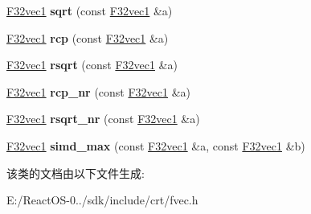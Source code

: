 \begin{DoxyCompactItemize}
\hyperlink{class_f32vec1}{F32vec1} {\bfseries sqrt} (const \hyperlink{class_f32vec1}{F32vec1} \&a)
\item 
\mbox{\label{class_f32vec1_a11d412a87554511165468d68f84c8e54}} 
\hyperlink{class_f32vec1}{F32vec1} {\bfseries rcp} (const \hyperlink{class_f32vec1}{F32vec1} \&a)
\item 
\mbox{\label{class_f32vec1_ae2e0a1b12c131d351a0bdb305dced837}} 
\hyperlink{class_f32vec1}{F32vec1} {\bfseries rsqrt} (const \hyperlink{class_f32vec1}{F32vec1} \&a)
\item 
\mbox{\label{class_f32vec1_a86d1b377e4843d7479ef987c0fcc3f2e}} 
\hyperlink{class_f32vec1}{F32vec1} {\bfseries rcp\+\_\+nr} (const \hyperlink{class_f32vec1}{F32vec1} \&a)
\item 
\mbox{\label{class_f32vec1_a056a1cf94dd83070894059cd0fccbdd5}} 
\hyperlink{class_f32vec1}{F32vec1} {\bfseries rsqrt\+\_\+nr} (const \hyperlink{class_f32vec1}{F32vec1} \&a)
\item 
\mbox{\label{class_f32vec1_aebce5bd821591a37f885f37fcdbf6fae}} 
\hyperlink{class_f32vec1}{F32vec1} {\bfseries simd\+\_\+max} (const \hyperlink{class_f32vec1}{F32vec1} \&a, const \hyperlink{class_f32vec1}{F32vec1} \&b)
\end{DoxyCompactItemize}


该类的文档由以下文件生成\+:\begin{DoxyCompactItemize}
\item 
E\+:/\+React\+O\+S-\/0../sdk/include/crt/fvec.\+h\end{DoxyCompactItemize}
